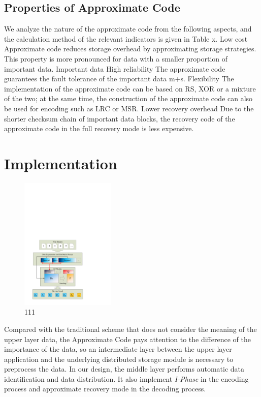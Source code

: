 \documentclass[sigconf]{acmart}
\begin{document}
\subsection{Properties of Approximate Code}

We analyze the nature of the approximate code from the following aspects, and the calculation method of the relevant indicators is given in Table x.
Low cost Approximate code reduces storage overhead by approximating storage strategies. This property is more pronounced for data with a smaller proportion of important data.
Important data High reliability The approximate code guarantees the fault tolerance of the important data m+s.
Flexibility The implementation of the approximate code can be based on RS, XOR or a mixture of the two; at the same time, the construction of the approximate code can also be used for encoding such as LRC or MSR.
Lower recovery overhead Due to the shorter checksum chain of important data blocks, the recovery code of the approximate code in the full recovery mode is less expensive.


\section{Implementation}

\begin{figure}[htb]
\centering
\includegraphics[width=0.4\textwidth]{photo/implementation.pdf}
\caption{111}
\label{fig-implementation}
\end{figure}

Compared with the traditional scheme that does not consider the meaning of the upper layer data, the Approximate Code pays attention to the difference of the importance of the data, so an intermediate layer between the upper layer application and the underlying distributed storage module is necessary to preprocess the data. In our design, the middle layer performs automatic data identification and data distribution. It also implement \emph{I-Phase} in the encoding process and approximate recovery mode in the decoding process.
\end{document}
